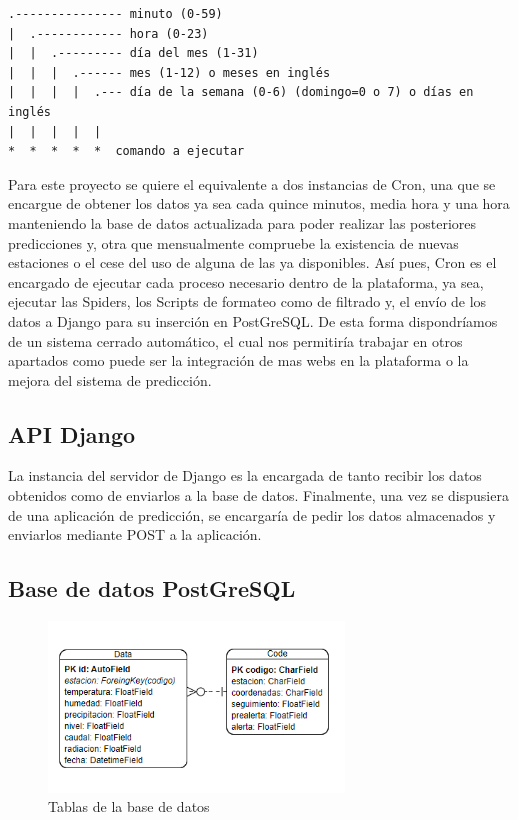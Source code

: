 \begin{verbatim}
.--------------- minuto (0-59) 
|  .------------ hora (0-23)
|  |  .--------- día del mes (1-31)
|  |  |  .------ mes (1-12) o meses en inglés
|  |  |  |  .--- día de la semana (0-6) (domingo=0 o 7) o días en inglés 
|  |  |  |  |
*  *  *  *  *  comando a ejecutar
\end{verbatim}

Para este proyecto se quiere el equivalente a dos instancias de Cron, una que se encargue de obtener los datos ya sea cada quince minutos, media hora y una hora manteniendo la base de datos actualizada para poder realizar las posteriores predicciones y, otra que mensualmente compruebe la existencia de nuevas estaciones o el cese del uso de alguna de las ya disponibles.\newline
\newline
Así pues, Cron es el encargado de ejecutar cada proceso necesario dentro de la plataforma, ya sea, ejecutar las Spiders, los Scripts de formateo como de filtrado y, el envío de los datos a Django para su inserción en PostGreSQL. De esta forma dispondríamos de un sistema cerrado automático, el cual nos permitiría trabajar en otros apartados como puede ser la integración de mas webs en la plataforma o la mejora del sistema de predicción.

\subsection{API Django}
La instancia del servidor de Django es la encargada de tanto recibir los datos obtenidos como de enviarlos a la base de datos. Finalmente, una vez se dispusiera de una aplicación de predicción, se encargaría de pedir los datos almacenados y enviarlos mediante POST a la aplicación.

\subsection{Base de datos PostGreSQL}

\begin{figure} [H]
	\centering
	\includegraphics[width=0.7\textwidth]{fig/TablasBBDD.png}
	\caption[Tablas de la base de datos]{Tablas de la base de datos}
	\label{fig:ej33}
\end{figure}

